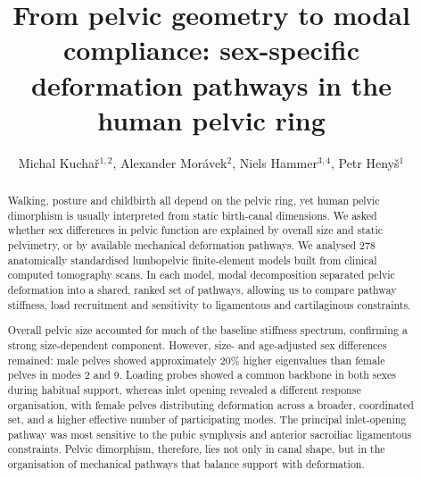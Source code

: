 \documentclass[openacc]{rsproca_new}
\begin{document}
\title{From pelvic geometry to modal compliance: sex-specific deformation pathways in the human pelvic ring}

\author{Michal Kucha\v{r}$^{1,2}$, Alexander Mor\'{a}vek$^{2}$, Niels Hammer$^{3,4}$, Petr Heny\v{s}$^{1}$}

\address{$^{1}$Institute of New Technologies and Applied Informatics, Faculty of Mechatronics, Informatics and Interdisciplinary Studies, Technical University of Liberec, Liberec, Czech Republic\\
$^{2}$Department of Anatomy, Faculty of Medicine in Hradec Kr\'{a}lov\'{e}, Charles University, Hradec Kr\'{a}lov\'{e}, Czech Republic\\
$^{3}$Division of Macroscopic and Clinical Anatomy, Gottfried Schatz Research Center, Medical University of Graz, Graz, Austria\\
$^{4}$Department of Orthopedic and Trauma Surgery, University of Leipzig, Leipzig, Germany; Division of Biomechatronics, Fraunhofer IWU, Dresden, Germany}

\subject{biomechanics, evolutionary anthropology, obstetrics}




\begin{abstract}
Walking, posture and childbirth all depend on the pelvic ring, yet human pelvic dimorphism is usually interpreted from static birth-canal dimensions. We asked whether sex differences in pelvic function are explained by overall size and static pelvimetry, or by available mechanical deformation pathways. We analysed 278 anatomically standardised lumbopelvic finite-element models built from clinical computed tomography scans. In each model, modal decomposition separated pelvic deformation into a shared, ranked set of pathways, allowing us to compare pathway stiffness, load recruitment and sensitivity to ligamentous and cartilaginous constraints.

Overall pelvic size accounted for much of the baseline stiffness spectrum, confirming a strong size-dependent component. However, size- and age-adjusted sex differences remained: male pelves showed approximately 20\% higher eigenvalues than female pelves in modes 2 and 9. Loading probes showed a common backbone in both sexes during habitual support, whereas inlet opening revealed a different response organisation, with female pelves distributing deformation across a broader, coordinated set, and a higher effective number of participating modes. The principal inlet-opening pathway was most sensitive to the pubic symphysis and anterior sacroiliac ligamentous constraints. Pelvic dimorphism, therefore, lies not only in canal shape, but in the organisation of mechanical pathways that balance support with deformation.
\end{abstract}
\end{document}
